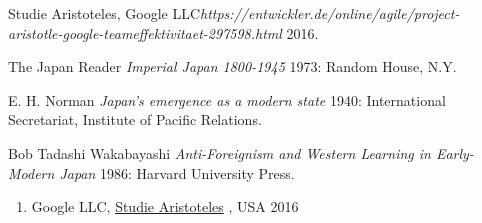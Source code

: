 \documentclass[12pt]{scrartcl}
\begin{document}
\renewcommand{\bibname}{Literaturverzeichnis}
\begin{thebibliography}{1}

   Studie Aristoteles, Google LLC{\em https://entwickler.de/online/agile/project-aristotle-google-teameffektivitaet-297598.html}  2016.

    The Japan Reader {\em Imperial Japan 1800-1945} 1973:
  Random House, N.Y.

   E. H. Norman {\em Japan's emergence as a modern
  state} 1940: International Secretariat, Institute of Pacific
  Relations.

   Bob Tadashi Wakabayashi {\em Anti-Foreignism and Western
  Learning in Early-Modern Japan} 1986: Harvard University Press.

  \end{thebibliography}
\begin{enumerate}
\item Google LLC, \href {https://entwickler.de/online/agile/project-aristotle-google-teameffektivitaet-297598.html}{Studie Aristoteles} , USA 2016
\end{enumerate}
\end{document}
